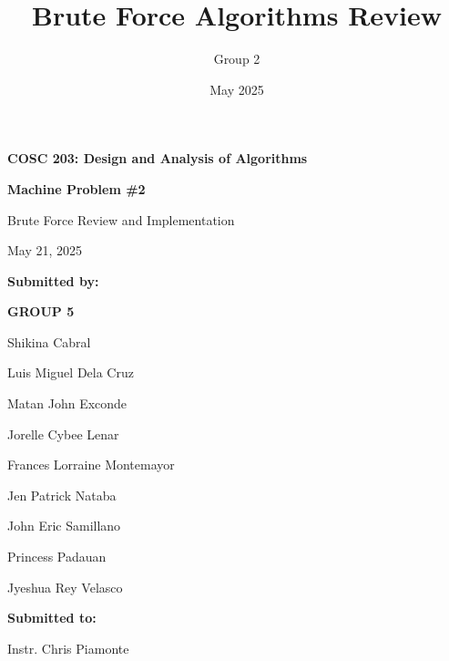 \documentclass[a4paper, 11pt]{article}
\title{\textbf{Brute Force Algorithms Review}}
\author{Group 2}
\date{May 2025}
\begin{document}
\begin{titlepage}
    \centering
    \vspace*{2cm}

    {\Large \textbf{COSC 203: Design and Analysis of Algorithms} \par}
    \vspace{1cm}

    {\LARGE \textbf{Machine Problem \#2} \par}
    \vspace{0.5cm}
    
    {\Large Brute Force Review and Implementation \par}
    \vspace{2cm}

    {\large May 21, 2025 \par}
    \vspace{2cm}

    {\large \textbf{Submitted by:} \par}
    {\large \textbf{GROUP 5} \par}
    {\large Shikina Cabral \par}    
    {\large Luis Miguel Dela Cruz \par}
    {\large Matan John Exconde \par}
    {\large Jorelle Cybee Lenar \par}
    {\large Frances Lorraine Montemayor \par}
    {\large Jen Patrick Nataba \par}
    {\large John Eric Samillano \par}
    {\large Princess Padauan \par}
    {\large Jyeshua Rey Velasco \par}
    \vspace{1cm}

    {\large \textbf{Submitted to:} \par}
    {\large Instr. Chris Piamonte \par}

\end{titlepage}

\tableofcontents
\end{document}
